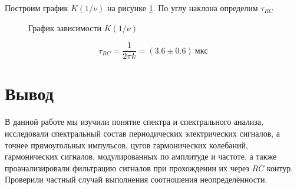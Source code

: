 \documentclass[a4paper, 12pt]{article}
\begin{document}
                Построим график $K(1/\nu)$ на рисунке \ref{plot:F.28}. По углу наклона определим $\tau_{RC}$

                \begin{figure}[ht]
                    \centering
                    \begin{minipage}[ht]{0.49\linewidth}
                        \caption{График зависимости $K(1/\nu)$}
                        \label{plot:F.28}
                    \end{minipage}
                \end{figure}

                $$
                    \tau_{RC} = \frac{1}{2 \pi k} = (3.6 \pm 0.6)~мкс
                $$

    \section{Вывод}

        В данной работе мы изучили понятие спектра и спектрального анализа, исследовали спектральный состав периодических электрических сигналов, а точнее прямоугольных импульсов, цугов гармонических колебаний, гармонических сигналов, модулированных по амплитуде и частоте, а также проанализировали фильтрацию сигналов при прохождении их через $RC$ контур. Проверили частный случай выполнения соотношения неопределённости.
\end{document}
